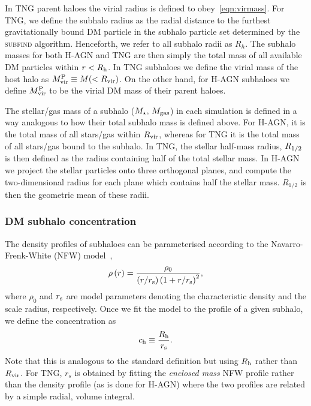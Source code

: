 \documentclass[usenatbib,useAMS]{mnras}
\begin{document}
In TNG parent haloes the virial radius is defined to obey~\cref{eqn:virmass}. For TNG, we define the subhalo radius as the radial distance to the furthest gravitationally bound DM particle in the subhalo particle set determined by the \textsc{subfind} algorithm. Henceforth, we refer to all subhalo radii as $R_h$. The subhalo masses for both H-AGN and TNG are then simply the total mass of all available DM particles within $r < R_{\rm h}$.
In TNG subhaloes we define the virial mass of the host halo as $M_{\rm vir}^{\rm P} \equiv M(<R_{\rm vir})$. On the other hand, for H-AGN subhaloes we define $M_{\rm vir}^{\rm P}$ to be the virial DM mass of their parent haloes.


The stellar/gas mass of a subhalo ($M_\star,\,M_{\rm gas}$) in each simulation is defined in a way analogous to how their total subhalo mass is defined above. For H-AGN, it is the total mass of all stars/gas within $R_{\rm vir}$, whereas for TNG it is the total mass of all stars/gas bound to the subhalo. In TNG, the stellar half-mass radius, $R_{\rm 1/2}$ is then defined as the radius containing half of the total stellar mass. In H-AGN we project the stellar particles onto three orthogonal planes, and compute the two-dimensional radius for each plane which contains half the stellar mass. $R_{1/2}$ is then the geometric mean of these radii.


\subsubsection{\Acl{DM} subhalo concentration}\label{sec:halo_concentration}

The density profiles of subhaloes can be parameterised according to the Navarro-Frenk-White (NFW) model~\citep{Navarro_1996},
\begin{equation}
\label{eq:nfw_profile}
	\rho \left( r \right) = \frac{\rho_0}{\left( r / r_{\rm s} \right) \left( 1 + r / r_{\rm s} \right)^{2}},
\end{equation}
where $\rho_0$ and $r_{\rm s}$ are model parameters denoting the characteristic density and the scale radius, respectively. Once we fit the model to the profile of a given subhalo, we define the concentration as
\begin{equation}
    c_{\rm h} \equiv \frac{R_{\rm h}}{r_{\rm s}}.
\end{equation}
Note that this is analogous to the standard definition but using $R_{\rm h}$ rather than $R_{\rm vir}$. For TNG, $r_s$ is obtained by fitting the \emph{enclosed mass} NFW profile rather than the density profile (as is done for H-AGN) where the two profiles are related by a simple radial, volume integral.
\end{document}
